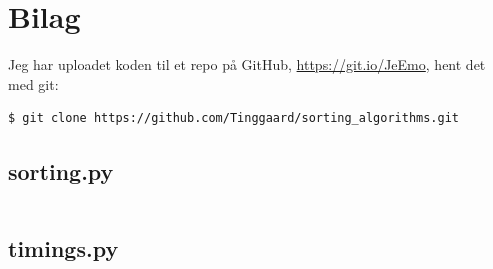 \documentclass[12pt]{article}
\begin{document}
    \section{Bilag}
    Jeg har uploadet koden til et repo på GitHub, \url{https://git.io/JeEmo}, hent det med git:
    \begin{verbatim}
$ git clone https://github.com/Tinggaard/sorting_algorithms.git
    \end{verbatim}


        \subsection{sorting.py}
        \label{file:sorting}
        \inputminted[python3, linenos, breaklines, frame=lines, fontsize=\footnotesize]{python}{sorting.py}

    \newpage

        \subsection{timings.py}
        \label{file:timing}
        \inputminted[python3, linenos, breaklines, frame=lines, fontsize=\footnotesize]{python}{timings.py}
\end{document}
